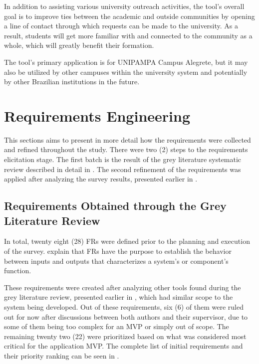 In addition to assisting various university outreach activities, the tool's overall goal is to improve ties between the academic and outside communities by opening a line of contact through which requests can be made to the university.
As a result, students will get more familiar with and connected to the community as a whole, which will greatly benefit their formation.

The tool's primary application is for \ac{UNIPAMPA} Campus Alegrete, but it may also be utilized by other campuses within the university system and potentially by other Brazilian institutions in the future.

\section{Requirements Engineering}\label{ext:requirement-engineering}

This sections aims to present in more detail how the requirements were collected and refined throughout the study. There were two (2) steps to the requirements elicitation stage. The first batch is the result of the grey literature systematic review described in detail in . The second refinement of the requirements was applied after analyzing the survey results, presented earlier in .

\subsection{Requirements Obtained through the Grey Literature Review}\label{ext:requirements-grey}

In total, twenty eight (28) \acp{FR} were defined prior to the planning and execution of the survey. \textcite{Clarkson2005-sy} explain that \acp{FR} have the purpose to establish the behavior between inputs and outputs that characterizes a system's or component's function.

These requirements were created after analyzing other tools found during the grey literature review, presented earlier in , which had similar scope to the system being developed. Out of these requirements, six (6) of them were ruled out for now after discussions between both authors and their supervisor, due to some of them being too complex for an \ac{MVP} or simply out of scope. The remaining twenty two (22) were prioritized based on what was considered most critical for the application \ac{MVP}. The complete list of initial requirements and their priority ranking can be seen in .

